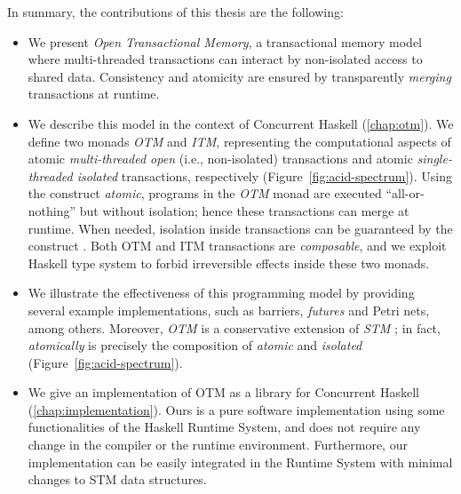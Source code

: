 In summary, the contributions of this thesis are the following:
\begin{itemize}
\item We present \emph{Open Transactional Memory}, a transactional memory model where multi-threaded transactions can interact by non-isolated access to shared data. Consistency and atomicity are ensured by transparently \emph{merging} transactions at runtime.

\item We describe this model in the context of Concurrent Haskell (\cref{chap:otm}).
We define two monads \emph{OTM} and \emph{ITM}, representing the computational aspects of atomic \emph{multi-threaded open} (i.e., non-isolated) transactions and atomic \emph{single-threaded isolated} transactions, respectively (Figure~\ref{fig:acid-spectrum}).
Using the construct \emph{atomic}, programs in the \emph{OTM} monad are executed ``all-or-nothing'' but without isolation; hence these transactions can merge at runtime.
When needed, isolation inside transactions can be guaranteed by the construct .
Both OTM and ITM transactions are \emph{composable},
and we exploit Haskell type system to forbid irreversible effects inside these two monads.

\item We illustrate the effectiveness of this programming model by providing several example implementations, such as barriers, \emph{futures} and Petri nets, among others.
Moreover, \emph{OTM} is a conservative extension 
of \emph{STM} \citep{Harris:2005:CMT:1065944.1065952}; in fact, \emph{atomically} is precisely the composition of \emph{atomic} and \emph{isolated} (Figure~\ref{fig:acid-spectrum}).

\item We give an implementation of OTM as a library for Concurrent Haskell (\cref{chap:implementation}).  Ours is a pure software implementation using some functionalities of the Haskell Runtime System, and does not require any change in the compiler or the runtime environment. Furthermore, our implementation can be easily integrated in the Runtime System with minimal changes to STM data structures.
\end{itemize}


